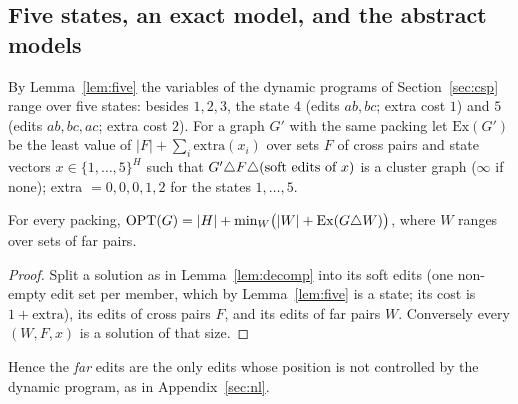 \subsection{Five states, an exact model, and the abstract models}\label{sec:softmodel}
By Lemma~\ref{lem:five} the variables of the dynamic programs of Section~\ref{sec:csp} range over five states: besides $1,2,3$, the state $4$ (edits $ab,bc$; extra cost $1$) and $5$ (edits $ab,bc,ac$; extra cost $2$). For a graph $G'$ with the same packing let $\mathrm{Ex}(G')$ be the least value of $|F|+\sum_i\mathrm{extra}(x_i)$ over sets $F$ of cross pairs and state vectors $x\in\{1,\dots,5\}^H$ such that $G'\triangle F\triangle(\text{soft edits of }x)$ is a cluster graph ($\infty$ if none); extra $=0,0,0,1,2$ for the states $1,\dots,5$.
\begin{lemma}[Exactness]\label{lem:sfE}
For every packing, $\mathrm{OPT}(G)=|H|+\min_{W}\bigl(|W|+\mathrm{Ex}(G\triangle W)\bigr)$, where $W$ ranges over sets of far pairs.
\end{lemma}
\begin{proof}
Split a solution as in Lemma~\ref{lem:decomp} into its soft edits (one non-empty edit set per member, which by Lemma~\ref{lem:five} is a state; its cost is $1+\mathrm{extra}$), its edits of cross pairs $F$, and its edits of far pairs $W$. Conversely every $(W,F,x)$ is a solution of that size.
\end{proof}
Hence the \emph{far} edits are the only edits whose position is not controlled by the dynamic program, as in Appendix~\ref{sec:nl}.

